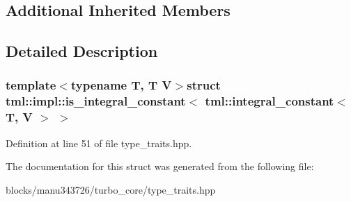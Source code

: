 \subsection*{Additional Inherited Members}


\subsection{Detailed Description}
\subsubsection*{template$<$typename T, T V$>$struct tml\+::impl\+::is\+\_\+integral\+\_\+constant$<$ tml\+::integral\+\_\+constant$<$ T, V $>$ $>$}



Definition at line 51 of file type\+\_\+traits.\+hpp.



The documentation for this struct was generated from the following file\+:\begin{DoxyCompactItemize}
\item 
blocks/manu343726/turbo\+\_\+core/type\+\_\+traits.\+hpp\end{DoxyCompactItemize}
